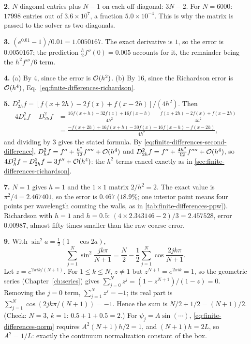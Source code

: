 \textbf{2.} $N$ diagonal entries plus $N-1$ on each off-diagonal: $3N-2$. For $N=6000$: $17998$ entries out of $3.6\times10^7$, a fraction $5.0\times10^{-4}$. This is why the matrix is passed to the solver as two diagonals.

\textbf{3.} $(e^{0.01}-1)/0.01=1.0050167$. The exact derivative is $1$, so the error is $0.0050167$; the prediction $\tfrac h2f''(0)=0.005$ accounts for it, the remainder being the $h^2f'''/6$ term.

\textbf{4.} (a) By 4, since the error is $\mathcal{O}(h^2)$. (b) By 16, since the Richardson error is $\mathcal{O}(h^4)$, Eq.~\eqref{eq:finite-differences-richardson}.

\textbf{5.} $D_{2h}^2f=[f(x+2h)-2f(x)+f(x-2h)]/(4h^2)$. Then
\begin{align*}
4D_h^2f-D_{2h}^2f&=\frac{16f(x+h)-32f(x)+16f(x-h)}{4h^2}-\frac{f(x+2h)-2f(x)+f(x-2h)}{4h^2}\\
&=\frac{-f(x+2h)+16f(x+h)-30f(x)+16f(x-h)-f(x-2h)}{4h^2},
\end{align*}
and dividing by 3 gives the stated formula. By \eqref{eq:finite-differences-second-difference}, $D_h^2f=f''+\tfrac{h^2}{12}f''''+\mathcal{O}(h^4)$ and $D_{2h}^2f=f''+\tfrac{4h^2}{12}f''''+\mathcal{O}(h^4)$, so $4D_h^2f-D_{2h}^2f=3f''+\mathcal{O}(h^4)$: the $h^2$ terms cancel exactly as in \cref{sec:finite-differences-richardson}.

\textbf{7.} $N=1$ gives $h=1$ and the $1\times1$ matrix $2/h^2=2$. The exact value is $\pi^2/4=2.467401$, so the error is $0.467$ ($18.9\%$; one interior point means four points per wavelength counting the walls, as in \cref{tab:finite-differences-ppw}). Richardson with $h=1$ and $h=0.5$: $(4\times2.343146-2)/3=2.457528$, error $0.00987$, almost fifty times smaller than the raw coarse error.

\textbf{9.} With $\sin^2a=\tfrac12(1-\cos2a)$,
\begin{equation*}
\sum_{j=1}^{N}\sin^2\frac{jk\pi}{N+1}=\frac N2-\frac12\sum_{j=1}^{N}\cos\frac{2jk\pi}{N+1}.
\end{equation*}
Let $z=e^{2\pi ik/(N+1)}$. For $1\le k\le N$, $z\ne1$ but $z^{N+1}=e^{2\pi ik}=1$, so the geometric series (Chapter~\ref{ch:series}) gives $\sum_{j=0}^{N}z^j=(1-z^{N+1})/(1-z)=0$. Removing the $j=0$ term, $\sum_{j=1}^{N}z^j=-1$; its real part is $\sum_{j=1}^N\cos(2jk\pi/(N+1))=-1$. Hence the sum is $N/2+1/2=(N+1)/2$. (Check: $N=3$, $k=1$: $0.5+1+0.5=2$.) For $\psi_j=A\sin(\cdots)$, \eqref{eq:finite-differences-norm} requires $A^2(N+1)h/2=1$, and $(N+1)h=2L$, so $A^2=1/L$: exactly the continuum normalization constant of the box.

